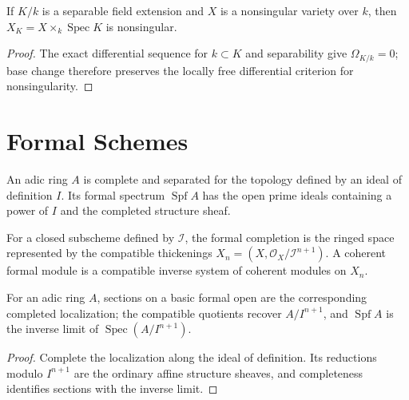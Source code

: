 \begin{theorem}
\label{thm:II-8-25A}
If $K/k$ is a separable field extension and $X$ is a nonsingular variety over $k$, then
$X_K=X\times_k\operatorname{Spec}K$ is nonsingular.
\end{theorem}
\begin{proof}
The exact differential sequence for $k\subset K$ and separability give $\Omega_{K/k}=0$; base
change therefore preserves the locally free differential criterion for nonsingularity.
\end{proof}

\section{Formal Schemes}

\begin{definition}
\label{def:II-9-adic}
An adic ring $A$ is complete and separated for the topology defined by an ideal of definition $I$. Its
formal spectrum $\operatorname{Spf}A$ has the open prime ideals containing a power of $I$ and the completed
structure sheaf.
\end{definition}

\begin{definition}
\label{def:II-9-completion}
For a closed subscheme defined by $\mathcal I$, the formal completion is the ringed space represented
by the compatible thickenings $X_n=(X,\mathcal O_X/\mathcal I^{n+1})$. A coherent formal module is a
compatible inverse system of coherent modules on $X_n$.
\end{definition}

\begin{proposition}
\label{prop:II-9-1}
For an adic ring $A$, sections on a basic formal open are the corresponding completed localization;
the compatible quotients recover $A/I^{n+1}$, and $\operatorname{Spf}A$ is the inverse limit of
$\operatorname{Spec}(A/I^{n+1})$.
\end{proposition}
\begin{proof}
Complete the localization along the ideal of definition. Its reductions modulo $I^{n+1}$ are the
ordinary affine structure sheaves, and completeness identifies sections with the inverse limit.
\end{proof}

